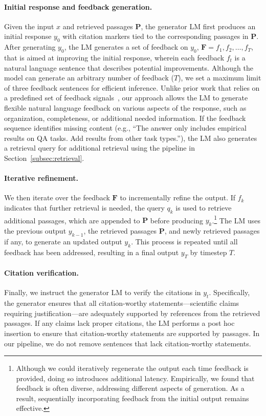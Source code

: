 \paragraph{Initial response and feedback generation.}
Given the input $x$ and retrieved passages $\mathbf{P}$, the generator LM first produces an initial response $y_0$  with citation markers tied to the corresponding passages in $\mathbf{P}$.
After generating $y_0$, the LM generates a set of feedback on $y_0$, $\mathbf{F} = {f_1, f_2, \ldots, f_T}$, that is aimed at improving the initial response, wherein each feedback $f_t$ is a natural language sentence that describes potential improvements. 
Although the model can generate an arbitrary number of feedback ($T$), we set a maximum limit of three feedback sentences for efficient inference. 
Unlike prior work that relies on a predefined set of feedback signals~\citep{asai2024selfrag}, our approach allows the LM to generate flexible natural language feedback on various aspects of the response, such as organization, completeness, or additional needed information. If the feedback sequence identifies missing content (e.g., ``The answer only includes empirical results on QA tasks. Add results from other task types.''), the LM also generates a retrieval query for additional retrieval using the pipeline in Section~\ref{subsec:retrieval}. 

\paragraph{Iterative refinement.} 
We then iterate over the feedback $\mathbf{F}$ to incrementally refine the output. 
If $f_k$ indicates that further retrieval is needed, the query $q_k$ is used to retrieve additional passages, which are appended to $\mathbf{P}$ before producing $y_k$.\footnote{Although we could iteratively regenerate the output each time feedback is provided, doing so introduces additional latency. Empirically, we found that feedback is often diverse, addressing different aspects of generation. As a result, sequentially incorporating feedback from the initial output remains effective.} 
The LM uses the previous output $y_{k-1}$, the retrieved passages $\mathbf{P}$, and newly retrieved passages if any, to generate an updated output $y_k$. 
This process is repeated until all feedback has been addressed, resulting in a final output $y_T$ by timestep $T$. 


\paragraph{Citation verification. }
Finally, we instruct the generator LM to verify the citations in $y_t$. 
Specifically, the generator ensures that all citation-worthy statements—scientific claims requiring justification—are adequately supported by references from the retrieved passages. 
If any claims lack proper citations, the LM performs a post hoc insertion to ensure that citation-worthy statements are supported by passages. In our pipeline, we do not remove sentences that lack citation-worthy statements. 


